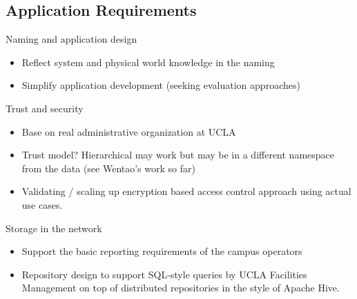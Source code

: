 \subsection{Application Requirements}



Naming and application design
\begin{itemize}
\item Reflect system and physical world knowledge in the naming 
\item Simplify application development (seeking evaluation approaches)
\end{itemize}

Trust and security
\begin{itemize}
\item Base on real administrative organization at UCLA
\item Trust model? Hierarchical may work but may be in a different namespace from the data  (see Wentao’s work so far) 
\item Validating / scaling up encryption based access control approach using actual use cases.
\end{itemize}

Storage in the network
\begin{itemize}
\item Support the basic reporting requirements of the campus operators
\item Repository design to support SQL-style queries by UCLA Facilities Management on top of distributed repositories in the style of Apache Hive. 
\end{itemize}
